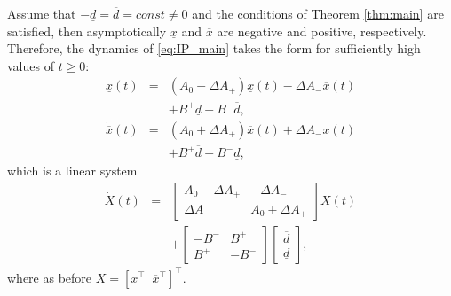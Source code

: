 \begin{remark}
	Assume that $-\underline{d}=\overline{d}=const\ne0$ and the conditions of Theorem \ref{thm:main} are satisfied, then asymptotically $\underline{x}$ and $\overline{x}$ are negative and positive, respectively. Therefore, the dynamics of \eqref{eq:IP_main} takes the form for sufficiently high values of $t\geq0$:
	\begin{eqnarray*}
		\dot{\underline{x}}(t) & = & (A_{0}-\Delta A_{+})\underline{x}(t)-\Delta A_{-}\overline{x}(t)\\
		&  & +B^{+}\underline{d}-B^{-}\overline{d},\\
		\dot{\overline{x}}(t) & = & (A_{0}+\Delta A_{+})\overline{x}(t)+\Delta A_{-}\underline{x}(t)\\
		&  & +B^{+}\overline{d}-B^{-}\underline{d},
	\end{eqnarray*}
	which is a linear system
	\begin{eqnarray}
	\label{eq:linear-asympt}
	\dot{X}(t) & = & \left[\begin{array}{cc}
	A_{0}-\Delta A_{+} & -\Delta A_{-}\\
	\Delta A_{-} & A_{0}+\Delta A_{+}
	\end{array}\right]X(t)\\
	&  & +\left[\begin{array}{cc}
	-B^{-} & B^{+}\\
	B^{+} & -B^{-}
	\end{array}\right]\left[\begin{array}{c}
	\overline{d}\\
	\underline{d}
	\end{array}\right],
	\end{eqnarray}
	where as before $X=[\underline{x}^{\top}\;\;\overline{x}^{\top}]^{\top}$.
\end{remark}

